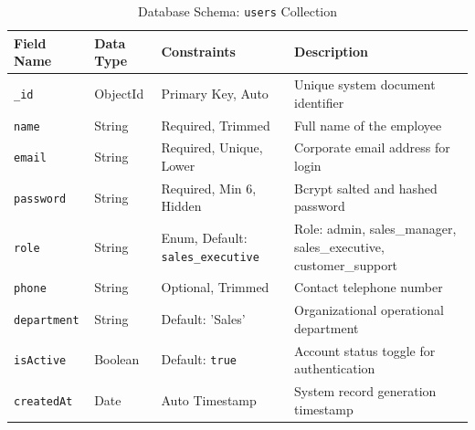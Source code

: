 \begin{table}[h!]
\centering
\caption{Database Schema: \texttt{users} Collection}
\label{tab:schema_user}
\renewcommand{\arraystretch}{1.2}
\begin{tabular}{|p{3cm}|p{3cm}|p{3.5cm}|p{4.5cm}|}
\hline
\textbf{Field Name} & \textbf{Data Type} & \textbf{Constraints} & \textbf{Description} \\ \hline
\texttt{\_id} & ObjectId & Primary Key, Auto & Unique system document identifier \\ \hline
\texttt{name} & String & Required, Trimmed & Full name of the employee \\ \hline
\texttt{email} & String & Required, Unique, Lower & Corporate email address for login \\ \hline
\texttt{password} & String & Required, Min 6, Hidden & Bcrypt salted and hashed password \\ \hline
\texttt{role} & String & Enum, Default: \texttt{sales\_executive} & Role: admin, sales\_manager, sales\_executive, customer\_support \\ \hline
\texttt{phone} & String & Optional, Trimmed & Contact telephone number \\ \hline
\texttt{department} & String & Default: 'Sales' & Organizational operational department \\ \hline
\texttt{isActive} & Boolean & Default: \texttt{true} & Account status toggle for authentication \\ \hline
\texttt{createdAt} & Date & Auto Timestamp & System record generation timestamp \\ \hline
\end{tabular}
\end{table}

